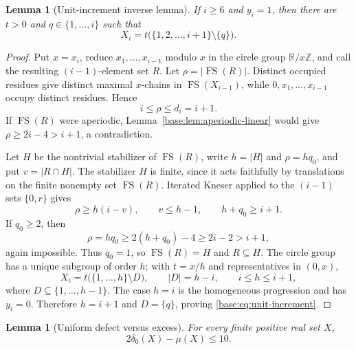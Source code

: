 \documentclass[11pt,a4paper]{article}
\newtheorem{lemma}[theorem]{Lemma}
\theoremstyle{remark}
\newcommand{\FS}{\operatorname{FS}}
\newcommand{\card}[1]{\lvert #1\rvert}
\begin{document}
\begin{lemma}[Unit-increment inverse lemma]\label{base:lem:unit-increment}
If $i\geq6$ and $y_i=1$, then there are $t>0$ and $q\in\{1,\ldots,i\}$
such that
\begin{equation}
 X_i=t\bigl(\{1,2,\ldots,i+1\}\setminus\{q\}\bigr).
 \label{base:eq:unit-increment}
\end{equation}
\end{lemma}

\begin{proof}
Put $x=x_i$, reduce $x_1,\ldots,x_{i-1}$ modulo $x$ in the circle group
$\mathbb R/x\mathbb Z$, and call the resulting $(i-1)$-element set $R$.
Let $\rho=\card{\FS(R)}$.  Distinct occupied residues give distinct maximal
$x$-chains in $\FS(X_{i-1})$, while
$0,x_1,\ldots,x_{i-1}$ occupy distinct residues.  Hence
\[
 i\leq\rho\leq d_i=i+1.
\]
If $\FS(R)$ were aperiodic, Lemma~\ref{base:lem:aperiodic-linear} would give
$\rho\geq2i-4>i+1$, a contradiction.

Let $H$ be the nontrivial stabilizer of $\FS(R)$, write
$h=\card H$ and $\rho=hq_0$, and put $v=\card{R\cap H}$.  The stabilizer $H$ is finite, since it acts faithfully by translations
on the finite nonempty set $\FS(R)$. Iterated Kneser applied to the
$(i-1)$ sets $\{0,r\}$ gives
\[
 \rho\geq h(i-v),\qquad v\leq h-1,\qquad h+q_0\geq i+1.
\]
If $q_0\geq2$, then
\[
 \rho=hq_0\geq2(h+q_0)-4\geq2i-2>i+1,
\]
again impossible.  Thus $q_0=1$, so $\FS(R)=H$ and $R\subseteq H$.
The circle group has a unique subgroup of order $h$; with $t=x/h$ and
representatives in $(0,x)$,
\[
 X_i=t\bigl(\{1,\ldots,h\}\setminus D\bigr),\qquad
 \card D=h-i,\qquad i\leq h\leq i+1,
\]
where $D\subseteq\{1,\ldots,h-1\}$.  The case $h=i$ is the homogeneous
progression and has $y_i=0$.  Therefore $h=i+1$ and $D=\{q\}$, proving
\eqref{base:eq:unit-increment}.
\end{proof}

\begin{lemma}[Uniform defect versus excess]\label{base:lem:defect-excess}
For every finite positive real set $X$,
\begin{equation}
 \boxed{2\delta_0(X)-\mu(X)\leq10.}
 \label{base:eq:defect-excess}
\end{equation}
\end{lemma}
\end{document}
